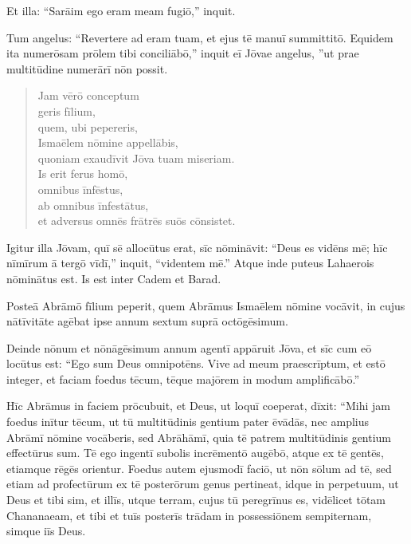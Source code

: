 Et illa: ``Sarāim ego eram meam fugiō,'' inquit.

\Versus Tum angelus: ``Revertere ad eram tuam, et ejus tē manuī summittitō.
\Versus Equidem ita numerōsam prōlem tibi conciliābō,'' inquit eī Jōvae angelus, ''ut prae multitūdine numerārī nōn possit.

\begin{verse}
\begin{patverse*}
\Versus Jam vērō conceptum \\
geris fīlium, \\
quem, ubi pepereris, \\
Ismaēlem nōmine appellābis, \\
quoniam exaudīvit Jōva tuam miseriam.\\
\Versus Is erit ferus homō, \\
omnibus īnfēstus, \\
ab omnibus īnfestātus, \\
et adversus omnēs frātrēs suōs cōnsistet.
\end{patverse*}
\end{verse}

\Versus Igitur illa Jōvam, quī sē allocūtus erat, sīc nōmināvit: ``Deus es vidēns mē; hīc nīmīrum ā tergō vīdī,'' inquit, ``videntem mē.''
\Versus Atque inde puteus Lahaerois nōminātus est. Is est inter Cadem et Barad.

\Versus Posteā Abrāmō fīlium peperit, quem Abrāmus Ismaēlem nōmine vocāvit,
\Versus in cujus nātīvitāte agēbat ipse annum sextum suprā octōgēsimum.



\Caput
\Versus Deinde nōnum et nōnāgēsimum annum agentī appāruit Jōva, et sīc cum eō locūtus est: ``Ego sum Deus omnipotēns. Vive ad meum praescrīptum, et estō integer,
\Versus et faciam foedus tēcum, tēque majōrem in modum amplificābō.''

\Versus Hīc Abrāmus in faciem prōcubuit, et Deus, ut loquī coeperat, dīxit:
\Versus ``Mihi jam foedus inītur tēcum, ut tū multitūdinis gentium pater ēvādās,
\Versus nec amplius Abrāmī nōmine vocāberis, sed Abrāhāmī, quia tē patrem multitūdinis gentium effectūrus sum.
\Versus Tē ego ingentī subolis incrēmentō augēbō, atque ex tē gentēs, etiamque rēgēs orientur.
\Versus Foedus autem ejusmodī faciō, ut nōn sōlum ad tē, sed etiam ad profectūrum ex tē posterōrum genus pertineat, idque in perpetuum, ut Deus et tibi sim, et illīs,
\Versus utque terram, cujus tū peregrīnus es, vidēlicet tōtam Chananaeam, et tibi et tuīs posterīs trādam in possessiōnem sempiternam, simque iīs Deus.

